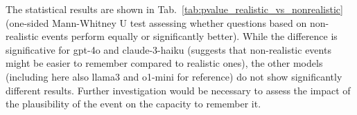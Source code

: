 \documentclass{article}
\begin{document}

The statistical results are shown in Tab.~\ref{tab:pvalue_realistic_vs_nonrealistic} (one-sided Mann-Whitney U test assessing whether questions based on non-realistic events perform equally or significantly better).
While the difference is significative for gpt-4o and claude-3-haiku (suggests that non-realistic events might be easier to remember compared to realistic ones), the other models (including here also llama3 and o1-mini for reference) do not show significantly different results.
Further investigation would be necessary to assess the impact of the plausibility of the event on the capacity to remember it.
\end{document}
